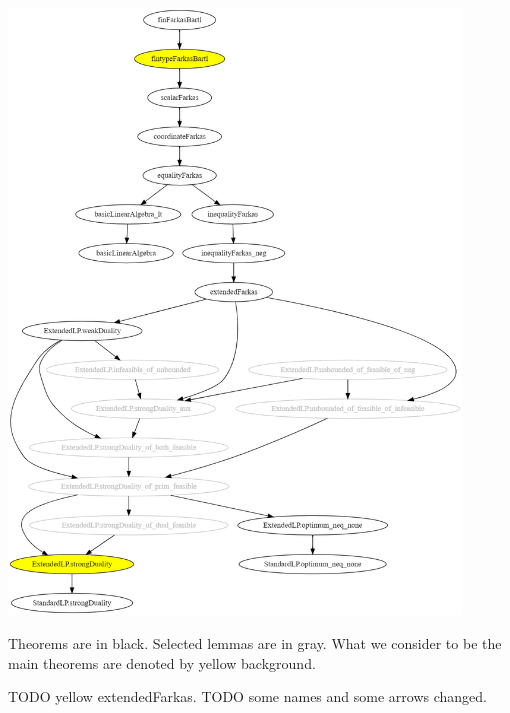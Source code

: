 \documentclass[]{article}
\renewcommand{\.}{\hskip .75pt}
\begin{document}
\includegraphics[width=0.9\textwidth]{theorems.png}

Theorems are in black. Selected lemmas are in gray.
What we consider to be the main theorems are
denoted by yellow background.

TODO yellow extendedFarkas.
{\color{blue} TODO some names and some arrows changed.}
\end{document}
